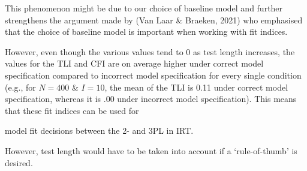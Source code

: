 \documentclass[Royal,sageapa,times,doublespace]{sagej}
\begin{document}
This phenomenon might be due to our choice of baseline model and further strengthens the argument made by (Van Laar \& Braeken, 2021) who emphasised that the choice of baseline model is important when working with fit indices. 


However, even though the various values tend to 0 as test length increases, the values for the TLI and CFI are on average higher under correct model specification compared to incorrect model specification for every single condition (e.g., for $N = 400$ \& $I = 10$, the mean of the TLI is 0.11 under correct model specification, whereas it is .00 under incorrect model specification). This means that these fit indices can be used for 

model fit decisions between the 2- and 3PL in IRT.  %

However, test length would have to be taken into account if a `rule-of-thumb' is desired. \\
\end{document}
